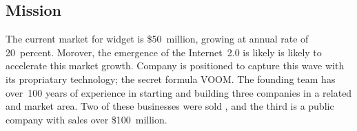 \documentclass[11pt,a4paper,titlepage]{article}
\begin{document}
\subsection{Mission}
The current market for widget is \$50~million, growing at annual rate of 20~percent. Morover, the emergence of the Internet~2.0 is likely is likely to accelerate this market growth. Company \ego{} is positioned to capture this wave with its propriatary technology; the secret formula VOOM. The founding team has over~100 years of experience in starting and building three companies in a related and market area. Two of these businesses were sold , and the third is a public company with sales over \$100~million.





\end{document}
